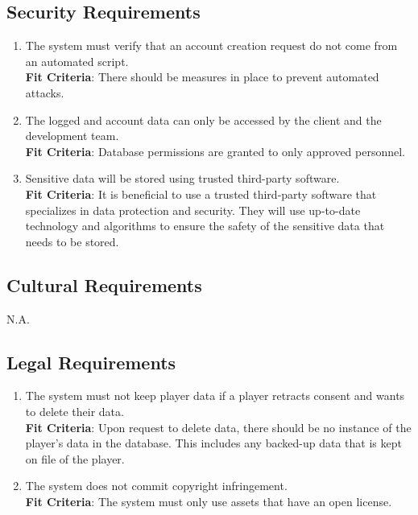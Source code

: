 \documentclass{article}
\begin{document}
\subsection{Security Requirements}
\begin{enumerate}[{SR}1. ]
    \item The system must verify that an account creation request do not come from an automated script.\\
    \textbf{Fit Criteria}: There should be measures in place to prevent automated attacks. \\
    
    \item The logged and account data can only be accessed by the client and the development team. \\
    \textbf{Fit Criteria}: Database permissions are granted to only approved personnel. \\
    
    \item Sensitive data will be stored using trusted third-party software. \\
    \textbf{Fit Criteria}: It is beneficial to use a trusted third-party software that specializes in data protection and security. They will use up-to-date technology and algorithms to ensure the safety of the sensitive data that needs to be stored.\\
    
\end{enumerate}
\subsection{Cultural Requirements}
N.A.
\subsection{Legal Requirements}
\begin{enumerate}[{LR}1. ]
    \item The system must not keep player data if a player retracts consent and wants to delete their data. \\
    \textbf{Fit Criteria}:  Upon request to delete data, there should be no instance of the player's data in the database. This includes any backed-up data that is kept on file of the player.
    \item The system does not commit copyright infringement. \\
    \textbf{Fit Criteria}: The system must only use assets that have an open license.
\end{enumerate}
\end{document}
